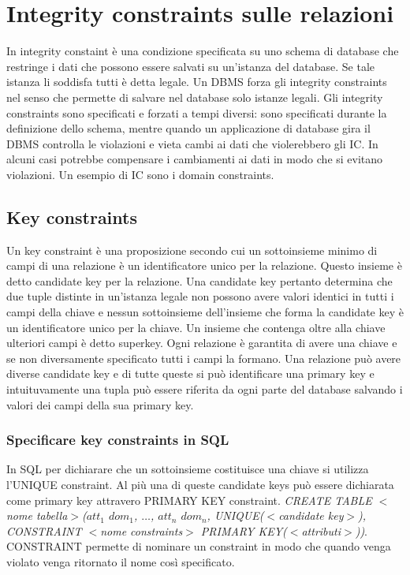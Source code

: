 \section{Integrity constraints sulle relazioni}
In integrity constaint \`e una condizione specificata su uno schema di database che restringe i dati che possono essere salvati su un'istanza del database. Se tale istanza li soddisfa tutti \`e detta legale. Un DBMS 
forza gli integrity constraints nel senso che permette di salvare nel database solo istanze legali. Gli integrity constraints sono specificati e forzati a tempi diversi: sono specificati durante la definizione dello 
schema, mentre quando un applicazione di database gira il DBMS controlla le violazioni e vieta cambi ai dati che violerebbero gli IC. In alcuni casi potrebbe compensare i cambiamenti ai dati in modo che si 
evitano violazioni. Un esempio di IC sono i domain constraints.
\subsection{Key constraints}
Un key constraint \`e una proposizione secondo cui un sottoinsieme minimo di campi di una relazione \`e un identificatore unico per la relazione. Questo insieme \`e detto candidate key per la relazione. Una 
candidate key pertanto determina che due tuple distinte in un'istanza legale non possono avere valori identici in tutti i campi della chiave e nessun sottoinsieme dell'insieme che forma la candidate key \`e un 
identificatore unico per la chiave. Un insieme che contenga oltre alla chiave ulteriori campi \`e detto superkey. Ogni relazione \`e garantita di avere una chiave e se non diversamente specificato tutti i campi la 
formano. Una relazione pu\`o avere diverse candidate key e di tutte queste si pu\`o identificare una primary key e intuituvamente una tupla pu\`o essere riferita da ogni parte del database salvando i valori dei 
campi della sua primary key. 
\subsubsection{Specificare key constraints in SQL}
In SQL per dichiarare che un sottoinsieme costituisce una chiave si utilizza l'UNIQUE constraint. Al pi\`u una di queste candidate keys pu\`o essere dichiarata come primary key attravero PRIMARY KEY constraint. 
\emph{CREATE TABLE $<$nome tabella$>$($att_1$  $dom_1$, $\dots$, $att_n$  $dom_n$, UNIQUE($<$candidate key$>$), CONSTRAINT $<$nome constraints$>$ PRIMARY KEY($<$attributi$>$))}. 
CONSTRAINT permette di nominare un constraint in modo che quando venga violato venga ritornato il nome cos\`i specificato.
